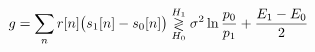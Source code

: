 \documentclass[preview]{standalone}
\begin{document}
\begin{align*}
\special{dvisvgm:raw <g id='unique000'>}g=\sum_n r[n]\big(s_1[n]-s_0[n]\big)\underset{H_0}{\overset{H_1}{\gtrless}}\sigma^2\ln\frac{p_0}{p_1}+\frac{E_1-E_0}{2}\special{dvisvgm:raw </g>}
\end{align*}
\end{document}
